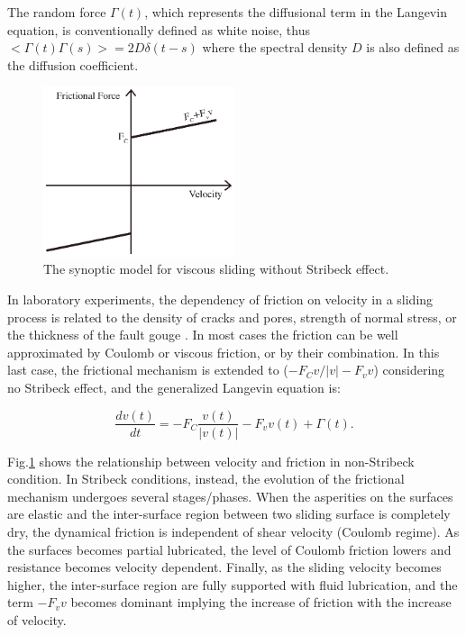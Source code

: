 \documentclass[%
 aip,
rsi,%
 amsmath,amssymb,
 reprint,%
]{revtex4-1}
\begin{document}
The random force $\Gamma(t)$, which represents the diffusional term in the Langevin equation, is conventionally defined as white noise, thus $<\Gamma(t)\Gamma(s)>=2D\delta(t-s)$ where the spectral density $D$ is also defined as the diffusion coefficient.

\begin{figure}
    \centering
    \includegraphics[width=0.5\textwidth]{Fig_Fv.eps}
    \caption{The synoptic model for viscous sliding without Stribeck effect. }
    \label{Fig_Fv}
\end{figure}

In laboratory experiments, the dependency of friction on velocity in a sliding process is related to the density of cracks and pores, strength of normal stress, or the thickness of the fault gouge \cite{byerlee_friction_1978,armstrong-helouvry_control_1991,h._olsson_friction_1997,marone_laboratory-derived_1998,frene_section_2001}. In most cases the friction can be well approximated by Coulomb or viscous friction, or by their combination. In this last case, the frictional mechanism is extended to ($-F_C v/|v|-F_v v$) considering no Stribeck effect\cite{armstrong-helouvry_control_1991,de_wit_new_1995}, and the generalized Langevin equation is:

\begin{equation}
    \frac{dv(t)}{dt}=-F_C \frac{v(t)}{|v(t)|} -F_v v(t) +\Gamma(t) \label{LE_VC}.
\end{equation}

Fig.\ref{Fig_Fv} shows the relationship between velocity and friction in non-Stribeck condition. In Stribeck conditions, instead, the evolution of the frictional mechanism undergoes several stages/phases\cite{armstrong-helouvry_control_1991}. When the asperities on the surfaces are elastic and the inter-surface region between two sliding surface is completely dry, the dynamical friction is independent of shear velocity (Coulomb regime). As the surfaces becomes partial lubricated, the level of Coulomb friction lowers and resistance becomes velocity dependent. Finally, as the sliding velocity becomes higher, the inter-surface region are fully supported with fluid lubrication, and the term $-F_v v$ becomes dominant implying the increase of friction with the increase of velocity.
\end{document}
